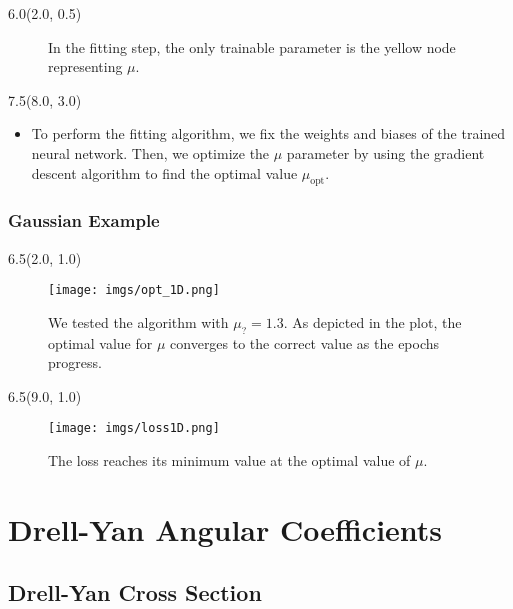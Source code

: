 \documentclass[12pt, xcolor={dvipsnames}, aspectratio = 169, sans,mathserif]{beamer}
\newenvironment{List}[2]
{\begin{textblock}{#1}#2
\begin{itemize}}
{\end{itemize}
\end{textblock}}
\newenvironment{Pic}[2]
{\begin{textblock}{#1}#2
\begin{figure}}
{\end{figure}
\end{textblock}}
\begin{document}
\begin{frame}
\begin{Pic}{6.0}{(2.0, 0.5)}
{
}
\caption{In the fitting step, the only trainable parameter is the yellow node representing $\mu$.}
\end{Pic}

\begin{List}{7.5}{(8.0, 3.0)}

  \item To perform the fitting algorithm, we fix the weights and biases of the trained neural network.
  Then, we optimize the $\mu$ parameter by using the gradient descent algorithm to find the optimal value $\mu_{\text{opt}}$.

\end{List}

\end{frame}

\begin{frame}
\frametitle{Gaussian Example}

\begin{Pic}{6.5}{(2.0, 1.0)}
\texttt{[image: imgs/opt\_1D.png]}
\caption{We tested the algorithm with $\mu_{?} = 1.3$. As depicted in the plot, the optimal value for $\mu$
converges to the correct value as the epochs progress.}
\end{Pic}

\begin{Pic}{6.5}{(9.0, 1.0)}
\texttt{[image: imgs/loss1D.png]}
\caption{The loss reaches its minimum value at the optimal value of $\mu$.}
\end{Pic}

\end{frame}

\section{Drell-Yan Angular Coefficients}
\subsection{Drell-Yan Cross Section}
\end{document}
